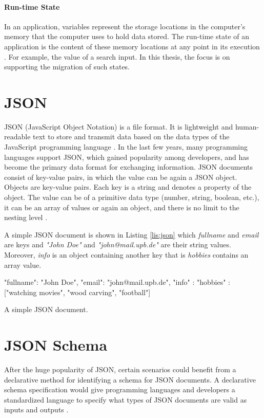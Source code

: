 \paragraph{Run-time State}
In an application, variables represent the storage locations in the computer's memory that the computer uses to hold data stored. The run-time state of an application is the content of these memory locations at any point in its execution \cite{Laplante2000-ui}. For example, the value of a search input. In this thesis, the focus is on supporting the migration of such states.

\section{JSON}
JSON (JavaScript Object Notation) is a file format. It is lightweight and human-readable text to store and transmit data based on the data types of the JavaScript programming language \cite{json}. In the last few years, many programming languages support JSON, which gained popularity among developers, and has become the primary data format for exchanging information. JSON documents consist of key-value pairs, in which the value can be again a JSON object. Objects are key-value pairs. Each key is a string and denotes a property of the object. The value can be of a primitive data type (number, string, boolean, etc.), it can be an array of values or again an object, and there is no limit to the nesting level \cite{json-schema}. 

A simple JSON document is shown in Listing \ref{lis:json} which \textit{fullname} and \textit{email} are keys and \textit{"John Doe"} and \textit{"john@mail.upb.de"} are their string values. Moreover, \textit{info} is an object containing another key that is \textit{hobbies} contains an array value.

\FloatBarrier
\begin{code}
\begin{json}
{
    "fullname": "John Doe",
    "email": "john@mail.upb.de",
    "info" : {
        "hobbies" : ["watching movies", "wood carving", "football"]
    }
}
\end{json}
\caption{A simple JSON document.}
\label{lis:json}
\end{code}
\FloatBarrier

\section{JSON Schema}
After the huge popularity of JSON, certain scenarios could benefit from a declarative method for identifying a schema for JSON documents.
A declarative schema specification would give programming languages and developers a standardized language to specify what types of JSON documents are valid as inputs and outputs \cite{json-schema}.

